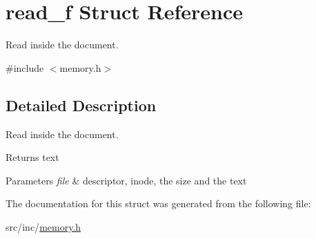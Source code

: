 \hypertarget{structread__f}{}\section{read\+\_\+f Struct Reference}
\label{structread__f}


Read inside the document.  




{\ttfamily \#include $<$memory.\+h$>$}



\subsection{Detailed Description}
Read inside the document. 

\begin{DoxyReturn}{Returns}
text 
\end{DoxyReturn}

\begin{DoxyParams}{Parameters}
{\em file} & descriptor, inode, the size and the text \\
\hline
\end{DoxyParams}


The documentation for this struct was generated from the following file\+:\begin{DoxyCompactItemize}
\item 
src/inc/\mbox{\hyperlink{memory_8h}{memory.\+h}}\end{DoxyCompactItemize}
